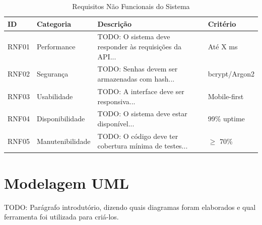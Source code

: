 \begin{table}[H]
  \caption{Requisitos Não Funcionais do Sistema}
  \label{tab:rnf}
  \centering
  \begin{tabularx}{\textwidth}{llXl}
    \toprule
    \textbf{ID}  & \textbf{Categoria}   & \textbf{Descrição}
                 & \textbf{Critério}    \\
    \midrule
    RNF01 & Performance   & TODO: O sistema deve responder às requisições
            da API...                     & Até X ms \\
    RNF02 & Segurança     & TODO: Senhas devem ser armazenadas com hash...
                                           & bcrypt/Argon2 \\
    RNF03 & Usabilidade   & TODO: A interface deve ser responsiva...
                                           & Mobile-first \\
    RNF04 & Disponibilidade & TODO: O sistema deve estar disponível...
                                           & 99\% uptime \\
    RNF05 & Manutenibilidade & TODO: O código deve ter cobertura mínima
             de testes...                  & $\geq$ 70\% \\
    \bottomrule
  \end{tabularx}
\end{table}


%
\section{Modelagem UML}
\label{sec:uml}

TODO: Parágrafo introdutório, dizendo quais diagramas foram elaborados
e qual ferramenta foi utilizada para criá-los.


